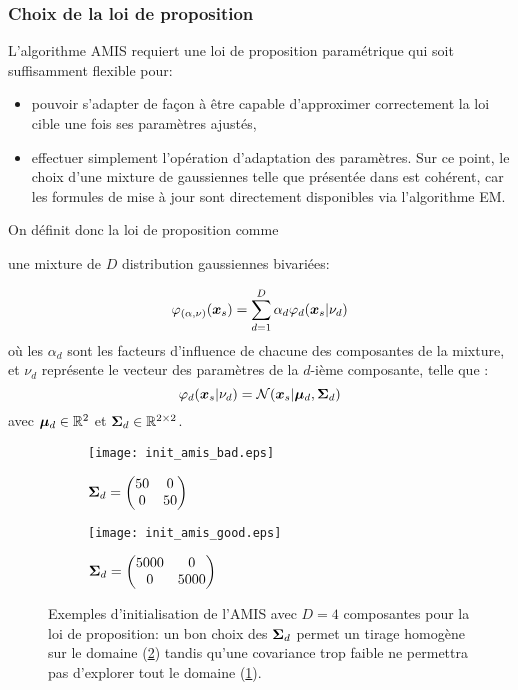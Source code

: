 {\subsubsection{Choix de la loi de proposition}

L'algorithme AMIS requiert une loi de proposition paramétrique qui soit suffisamment flexible pour:
{
	\begin{itemize}
		\item pouvoir s'adapter de façon à être capable d'approximer correctement la loi cible une fois ses paramètres ajustés,
		\item effectuer simplement l'opération d'adaptation des paramètres. Sur ce point, le choix d'une mixture de gaussiennes telle que présentée dans \cite{Cappe2008} est cohérent, car les formules de mise à jour sont directement disponibles via l'algorithme EM.
	\end{itemize}

On définit donc la loi de proposition comme} une mixture de $D$ distribution gaussiennes bivariées:

\begin{equation}
\varphi_{(\alpha,\nu)}({{\bm{x}_s}}) = \sum\limits_{d=1}^D \alpha_d \varphi_d({{\bm{x}_s}} | \nu_d)
\label{eq_AE_21}
\end{equation}
où les $\alpha_d$ sont les facteurs d'influence de chacune des composantes de la mixture, et $\nu_d$ représente le vecteur des paramètres de la $d$-ième composante, telle que : 
\begin{equation}
\varphi_d({{\bm{x}_s}} | \nu_d) = \mathcal{N}({{\bm{x}_s}} | {\bm{\mu}}_d, {\bm{\Sigma}}_d)
\label{eq_AE_21_bis}
\end{equation}
avec ${\bm{\mu}}_d \in \mathbb{R}^2$ et ${\bm{\Sigma}}_d \in \mathbb{R}^{2\times2}$.

 \begin{figure}[h!]
 	\centering
 	\begin{subfigure}[t]{0.5\textwidth}
 		\centering
 		\texttt{[image: init\_amis\_bad.eps]}
 		\caption{${\bm{\Sigma}}_d = 
 			\begin{pmatrix}
 			50 & 0 \\
 			0 & 50
 			\end{pmatrix}$}
 		\label{init_amis_bad}
 	\end{subfigure}%
 	\begin{subfigure}[t]{0.5\textwidth}
 		\centering
 		\texttt{[image: init\_amis\_good.eps]}
 		\caption{${\bm{\Sigma}}_d = 
 			\begin{pmatrix}
 			5000 & 0 \\
 			0 & 5000
 			\end{pmatrix}$}
 		\label{init_amis_good}
 	\end{subfigure}
 	\caption{Exemples d'initialisation de l'AMIS avec $D=4$ composantes pour la loi de proposition: un bon choix des ${\bm{\Sigma}}_d$ permet un tirage homogène sur le domaine (\ref{init_amis_good}) tandis qu'une covariance trop faible ne permettra pas d'explorer tout le domaine (\ref{init_amis_bad}).}
 	 \label{fig_init_amis}	
 \end{figure}
 
}
